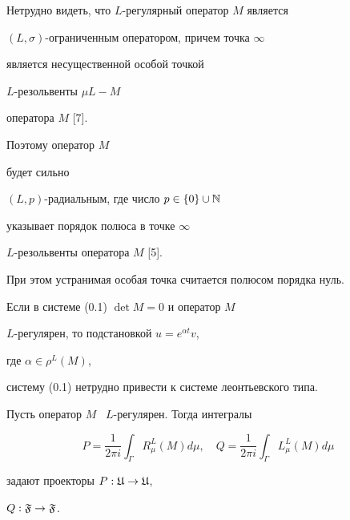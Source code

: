 \begin{notes}


Нетрудно видеть, что $L$-регулярный оператор $M$ является


$(L, \sigma)$-огра\-ни\-чен\-ным оператором, причем точка $\infty$


является несущественной особой точкой


$L$-резольвенты $\mu L - M$


оператора $M$ [7].


Поэтому оператор $M$


будет сильно


$(L, p)$-радиальным, где число $p\in \{0\}\cup{\Bbb N}$


указывает порядок полюса в точке $\infty$


$L$-резольвенты оператора $M$ [5].


При этом устранимая особая точка считается полюсом порядка нуль.


\end{notes}





\begin{notes}


Если в системе (0.1) $\det M = 0$ и оператор $M$


$L$-регулярен, то подстановкой $u = e^{\alpha t} v$,


где $\alpha\in \rho^L(M)$,


систему (0.1) нетрудно привести к системе леонтьевского типа.


\end{notes}





\begin{lems}


Пусть оператор $M$ \ $L$-регулярен. Тогда интегралы


\begin{equation}


P = \frac{1}{2\pi i}\int_{\Gamma}R_{\mu}^L(M) d\mu,\quad


Q = \frac{1}{2\pi i}\int_{\Gamma}L_{\mu}^L(M) d\mu


\end{equation}


задают проекторы $P : {\frak U}\to {\frak U}$,


$Q : {\frak F}\to {\frak F}$.


\end{lems}





